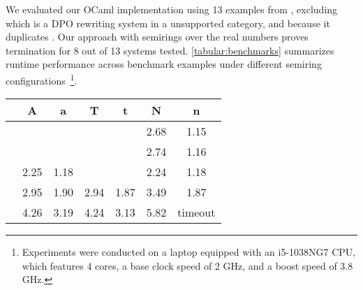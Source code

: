 We evaluated our OCaml implementation using 13 examples from \cite[Table 1]{endrullis2024generalized_arxiv_v2}, excluding \cite[Example 6.4]{endrullis2024generalized_arxiv_v2} which is a DPO rewriting system in a unsupported category, and \cite[Example 6]{bruggink2014termination} because it duplicates \cite[Example 4]{bruggink2015proving}. Our approach with semirings over the real numbers proves termination for 8 out of 13 systems tested. \autoref{tabular:benchmarks} summarizes runtime performance 
across benchmark examples under different semiring configurations~\footnote{Experiments were conducted on a laptop equipped with an i5-1038NG7 CPU, which features 4 cores, a base clock speed of 2 GHz, and a boost speed of 3.8 GHz.}.


\begin{table}[htb]   
    \renewcommand{\arraystretch}{1.2}
    \centering
\begin{tabular}{|c|c|c|c|c|c|c |}
    \hline
     &\;\;A\;\;&\;\;a\;\;&\;\;T\;\;&\;\;t\;\;&\;\; N\;\;&\;\;n\;\; \\
    \hline
    \cite[Example 6.2]{endrullis2024generalized_arxiv_v2} & & & & & 2.68 &1.15   \\
    \cite[Example 6.3]{endrullis2024generalized_arxiv_v2} & & & & & 2.74 &1.16   \\
    \cite[Example D.3]{endrullis2024generalized_arxiv_v2} &2.25 
    & 1.18
    & & & 2.24& 1.18    \\
    \cite[Example 3.8]{plump1995ontermination}
 & 2.95& 1.90 & 2.94 &1.87  & 3.49  &1.87   \\
    \cite[Example 4]{plump2018modular} &4.26& 3.19&  4.24 & 3.13 &
    5.82
    & timeout  \\


\end{tabular}
\end{table}
